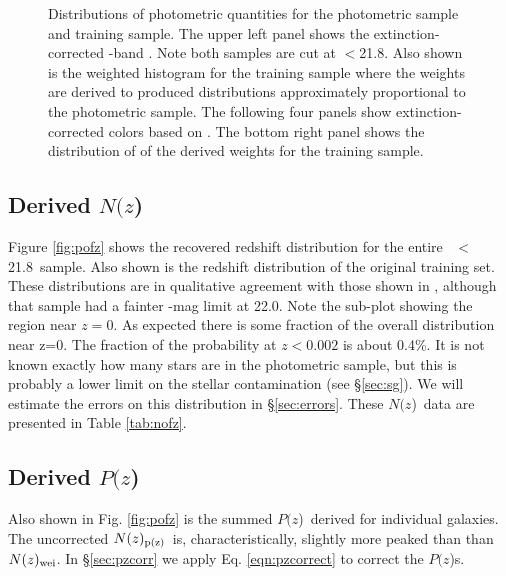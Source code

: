 \documentclass[preprint]{aastex}
\newcommand{\rmax}{21.8}
\newcommand{\pofz}{$P(z$)}
\newcommand{\Nofz}{$N(z$)}
\newcommand{\nwei}{N(z)_{\rm wei}}
\newcommand{\npz}{N(z)_{\rm p(z)}}
\begin{document}
\begin{figure}[p] \centering

    \caption{Distributions of photometric quantities for the photometric sample
    and training sample.  The upper left panel shows the extinction-corrected
    \rmag-band \cmodelmag.  Note both samples are cut at \rmag$ < $\rmax.  
    Also shown is the weighted histogram for the training sample where
    the weights are derived to produced distributions approximately 
    proportional to the photometric sample.
    The following four panels show extinction-corrected colors based on
    \modelmag.  The bottom right panel shows the distribution of of the
    derived weights for the training sample. }
    \label{fig:varhist}

    \vspace{2em}
\end{figure}

\subsection{Derived \Nofz}

Figure \ref{fig:pofz} shows the recovered redshift distribution for the entire
\rmag\ $<$ \rmax\ sample.  Also shown is the redshift distribution of the
original training set.  These distributions are in qualitative agreement with
those shown in \citet{CunhaPhotoz09}, although that sample had a fainter
\rmag-mag limit at 22.0.  Note the sub-plot showing the region near $z=0$.  As
expected there is some fraction of the overall distribution near z=0.  The
fraction of the probability at $z < 0.002$ is about 0.4\%.  It is not known exactly how many
stars are in the photometric sample, but this is probably a lower limit on the
stellar contamination (see \S \ref{sec:sg}).  We will estimate the errors on
this distribution in \S \ref{sec:errors}. These \Nofz\ data are presented in
Table \ref{tab:nofz}.


\subsection{Derived \pofz}

Also shown in Fig. \ref{fig:pofz} is the summed \pofz\ derived for individual
galaxies.  The uncorrected $\npz$\ is, characteristically, slightly more peaked than
than $\nwei$.
In \S \ref{sec:pzcorr} we apply Eq. \ref{eqn:pzcorrect} to correct the \pofz s.
\end{document}

